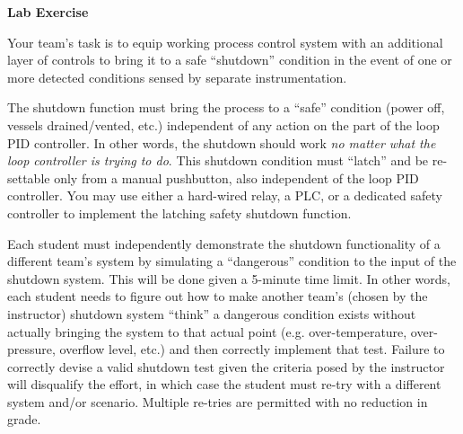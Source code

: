 

\noindent
{\bf Lab Exercise}

\vskip 5pt

Your team's task is to equip working process control system with an additional layer of controls to bring it to a safe ``shutdown'' condition in the event of one or more detected conditions sensed by separate instrumentation.

The shutdown function must bring the process to a ``safe'' condition (power off, vessels drained/vented, etc.) independent of any action on the part of the loop PID controller.  In other words, the shutdown should work {\it no matter what the loop controller is trying to do}.  This shutdown condition must ``latch'' and be re-settable only from a manual pushbutton, also independent of the loop PID controller.  You may use either a hard-wired relay, a PLC, or a dedicated safety controller to implement the latching safety shutdown function.

Each student must independently demonstrate the shutdown functionality of a different team's system by simulating a ``dangerous'' condition to the input of the shutdown system.  This will be done given a 5-minute time limit.  In other words, each student needs to figure out how to make another team's (chosen by the instructor) shutdown system ``think'' a dangerous condition exists without actually bringing the system to that actual point (e.g. over-temperature, over-pressure, overflow level, etc.) and then correctly implement that test.  Failure to correctly devise a valid shutdown test given the criteria posed by the instructor will disqualify the effort, in which case the student must re-try with a different system and/or scenario.  Multiple re-tries are permitted with no reduction in grade.

\vskip 10pt



